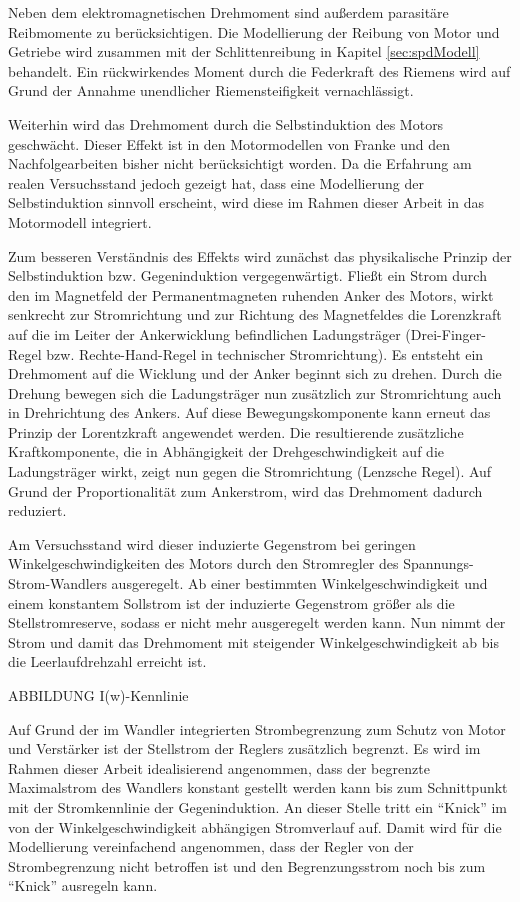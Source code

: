 Neben dem elektromagnetischen Drehmoment sind außerdem parasitäre Reibmomente zu berücksichtigen. Die Modellierung der Reibung von Motor und Getriebe wird zusammen mit der Schlittenreibung in Kapitel \ref{sec:spdModell} behandelt. Ein rückwirkendes Moment durch die Federkraft des Riemens wird auf Grund der Annahme unendlicher Riemensteifigkeit vernachlässigt. 

Weiterhin wird das Drehmoment durch die Selbstinduktion des Motors geschwächt. Dieser Effekt ist in den Motormodellen von Franke \cite{franke} und den Nachfolgearbeiten bisher nicht berücksichtigt worden. Da die Erfahrung am realen Versuchsstand jedoch gezeigt hat, dass eine Modellierung der Selbstinduktion sinnvoll erscheint, wird diese im Rahmen dieser Arbeit in das Motormodell integriert.

Zum besseren Verständnis des Effekts wird zunächst das physikalische Prinzip der Selbstinduktion bzw. Gegeninduktion vergegenwärtigt. Fließt ein Strom durch den im Magnetfeld der Permanentmagneten ruhenden Anker des Motors, wirkt senkrecht zur Stromrichtung und zur Richtung des Magnetfeldes die Lorenzkraft auf die im Leiter der Ankerwicklung befindlichen Ladungsträger (Drei-Finger-Regel bzw. Rechte-Hand-Regel in technischer Stromrichtung). Es entsteht ein Drehmoment auf die Wicklung und der Anker beginnt sich zu drehen. Durch die Drehung bewegen sich die Ladungsträger nun zusätzlich zur Stromrichtung auch in Drehrichtung des Ankers. Auf diese Bewegungskomponente kann erneut das Prinzip der Lorentzkraft angewendet werden. Die resultierende zusätzliche Kraftkomponente, die in Abhängigkeit der Drehgeschwindigkeit auf die Ladungsträger wirkt, zeigt nun gegen die Stromrichtung (Lenzsche Regel). Auf Grund der Proportionalität zum Ankerstrom, wird das Drehmoment dadurch reduziert. 

Am Versuchsstand wird dieser induzierte Gegenstrom bei geringen Winkelgeschwindigkeiten des Motors durch den Stromregler des Spannungs-Strom-Wandlers ausgeregelt. Ab einer bestimmten Winkelgeschwindigkeit und einem konstantem Sollstrom ist der induzierte Gegenstrom größer als die Stellstromreserve, sodass er nicht mehr ausgeregelt werden kann. Nun nimmt der Strom und damit das Drehmoment mit steigender Winkelgeschwindigkeit ab bis die Leerlaufdrehzahl erreicht ist. 

ABBILDUNG I(w)-Kennlinie

Auf Grund der im Wandler integrierten Strombegrenzung zum Schutz von Motor und Verstärker ist der Stellstrom der Reglers zusätzlich begrenzt. Es wird im Rahmen dieser Arbeit idealisierend angenommen, dass der begrenzte Maximalstrom des Wandlers konstant gestellt werden kann bis zum Schnittpunkt mit der Stromkennlinie der Gegeninduktion. An dieser Stelle tritt ein "`Knick"' im von der Winkelgeschwindigkeit abhängigen Stromverlauf auf. Damit wird für die Modellierung vereinfachend angenommen, dass der Regler von der Strombegrenzung nicht betroffen ist und den Begrenzungsstrom noch bis zum "`Knick"' ausregeln kann.

